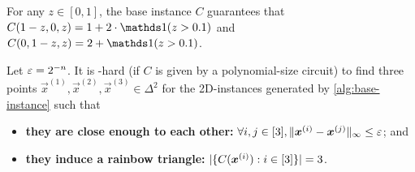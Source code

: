 \begin{fact}
    \label{lem:base-instance-lr-boundaries}
    For any $z\in [0,1]$, the base instance $C$ guarantees that $C(1-z,0,z)=1+2\cdot \ind(z>0.1)$ and $C(0,1-z,z)=2+\ind(z> 0.1)$. 
\end{fact}

\begin{lemma}
    \label{lem:base-instance-ppad-hard}
    Let $\varepsilon=2^{-n}$.
    It is \PPAD-hard (if $C$ is given by a polynomial-size circuit) 
    to find three points $\vec{x}^{(1)},\vec{x}^{(2)}, \vec{x}^{(3)}\in \Delta^{2}$ for the 2{\rm D}-\Sperner instances generated by \cref{alg:base-instance} such that
    \begin{itemize}[itemsep=0em]
        \item {\bf they are close enough to each other:} $\forall i,j\in [3], \| {\boldsymbol{x}^{(i)}-\boldsymbol{x}^{(j)}} \|_{\infty}\leq \varepsilon$; and
        \item {\bf they induce a rainbow triangle:} $|\{ {C(\boldsymbol{x}^{(i)}):i\in [3]} \}|=3$.
    \end{itemize}
\end{lemma}

